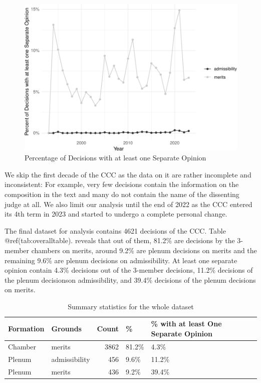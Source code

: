 \documentclass[
  11pt,
]{article}
\begin{document}
\begin{figure}
\centering
\includegraphics{separate_opinions_files/figure-latex/separate-opinion-ratio-1.pdf}
\caption{Percentage of Decisions with at least one Separate Opinion}
\end{figure}

We skip the first decade of the CCC as the data on it are rather
incomplete and inconsistent: For example, very few decisions contain the
information on the composition in the text and many do not contain the
name of the dissenting judge at all. We also limit our analysis until
the end of 2022 as the CCC entered its 4th term in 2023 and started to
undergo a complete personal change.

The final dataset for analysis contains 4621 decisions of the CCC. Table
@ref(tab:overalltable). reveals that out of them, 81.2\% are decisions
by the 3-member chambers on merits, around 9.2\% are plenum decisions on
merits and the remaining 9.6\% are plenum decisions on admissibility. At
least one separate opinion contain 4.3\% decisions out of the 3-member
decisions, 11.2\% decisions of the plenum decisionson admissibility, and
39.4\% decisions of the plenum decisions on merits.

\begin{longtable}[t]{llrll}
\caption{\label{tab:overalltable}Summary statistics for the whole dataset}\\
\toprule
\textbf{Formation} & \textbf{Grounds} & \textbf{Count} & \textbf{\%} & \textbf{\% with at least One Separate Opinion}\\
\midrule
Chamber & merits & 3862 & 81.2\% & 4.3\%\\
Plenum & admissibility & 456 & 9.6\% & 11.2\%\\
Plenum & merits & 436 & 9.2\% & 39.4\%\\
\bottomrule
\end{longtable}
\end{document}
